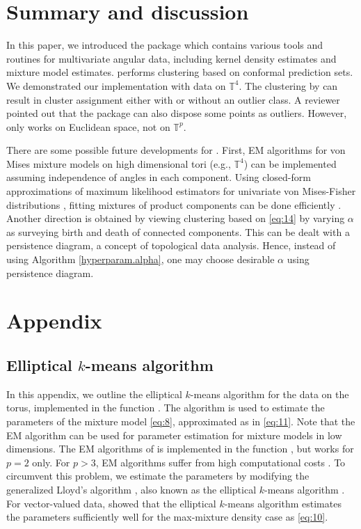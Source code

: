 \section{Summary and discussion}
{In this paper, we introduced the package  which contains various tools and routines for multivariate angular data, including kernel density estimates and mixture model estimates.  performs clustering based on conformal prediction sets. We demonstrated our implementation with data on $\mathbb{T}^4$. The clustering by  can result in cluster assignment either with or without an outlier class. A reviewer pointed out that the package  \citep{murphy2020gaussian, murphy2021package} can also dispose some points as outliers. However,  only works on Euclidean space, not on $\mathbb{T}^p$.

There are some possible future developments for . First, EM algorithms for von Mises mixture models on high dimensional tori (e.g., $\mathbb{T}^4$) can be implemented assuming independence of angles in each component. Using closed-form approximations of maximum likelihood estimators for univariate von Mises-Fisher distributions \citep{Banerjee2005, Hornik2014}, fitting mixtures of product components can be done efficiently \citep{grim2017approximation}.
Another direction is obtained by viewing clustering based on \eqref{eq:14} by varying $\alpha$ as surveying birth and death of connected components. This can be dealt with a persistence diagram, a concept of topological data analysis. Hence, instead of using Algorithm \ref{hyperparam.alpha}, one may choose desirable $\alpha$ using persistence diagram. 

}

\section{Appendix}

\subsection{Elliptical $k$-means algorithm}

In this appendix, we outline the elliptical $k$-means algorithm for the data on the torus, implemented in the function . The algorithm is used to estimate the parameters of the mixture model \eqref{eq:8}, approximated as in \eqref{eq:11}. Note that the EM algorithm can be used for parameter estimation for mixture models in low dimensions. The EM algorithms of \citet{Jung:2021} is implemented in the function , but works for $p=2$ only. For $p>3$, EM algorithms suffer from high computational costs \citep{Mardia:2012}. To circumvent this problem, we estimate the parameters by modifying the generalized Lloyd's algorithm \citep{Shin:2019}, also known as the elliptical $k$-means algorithm \citep{Sung:1998, Bishop}. For vector-valued data, \citet{Shin:2019} showed that the elliptical $k$-means algorithm estimates the parameters sufficiently well for the max-mixture density case as \eqref{eq:10}.

